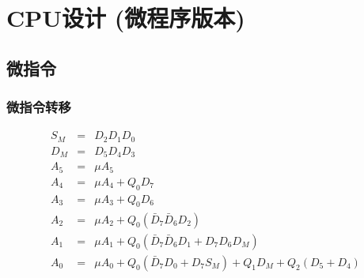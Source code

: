 \documentclass[10pt]{book}
\begin{document}
\chapter{CPU设计 (微程序版本)}
\section{微指令}
\subsection{微指令转移}
\begin{eqnarray}
S_M &=& D_2D_1D_0 \\
D_M &=& D_5D_4D_3 \\
A_5 &=& \mu A_5 \\
A_4 &=& \mu A_4 + Q_0D_7\\
A_3 &=& \mu A_3 + Q_0D_6\\
A_2 &=& \mu A_2 + Q_0(\bar D_7\bar D_6D_2) \\
A_1 &=& \mu A_1 + Q_0(\bar D_7\bar D_6D_1+D_7D_6D_M) \\
A_0 &=& \mu A_0 + Q_0(\bar D_7D_0+D_7S_M)+Q_1D_M+Q_2(D_5+D_4)
\end{eqnarray}
\end{document}
